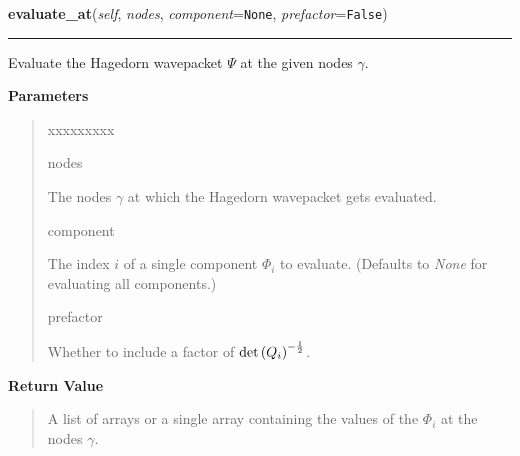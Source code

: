     \vspace{0.5ex}

\hspace{.8\funcindent}\begin{boxedminipage}{\funcwidth}

    \raggedright \textbf{evaluate\_at}(\textit{self}, \textit{nodes}, \textit{component}={\tt None}, \textit{prefactor}={\tt False})

    \vspace{-1.5ex}

    \rule{\textwidth}{0.5\fboxrule}
\setlength{\parskip}{2ex}
    Evaluate the Hagedorn wavepacket $\Psi$ at the given
    nodes $\gamma$.

\setlength{\parskip}{1ex}
      \textbf{Parameters}
      \vspace{-1ex}

      \begin{quote}
        \begin{Ventry}{xxxxxxxxx}

          \item[nodes]

          The nodes $\gamma$ at which the Hagedorn
          wavepacket gets evaluated.

          \item[component]

          The index $i$ of a single component $\Phi_i$
          to evaluate. (Defaults to \textit{None} for evaluating all components.)

          \item[prefactor]

          Whether to include a factor of
          $\det\left( Q_i \right)^{-\frac{1}{2}}$.

        \end{Ventry}

      \end{quote}

      \textbf{Return Value}
    \vspace{-1ex}

      \begin{quote}
      A list of arrays or a single array containing the values of the
      $\Phi_i$ at the nodes $\gamma$.

      \end{quote}

    \end{boxedminipage}

    \label{HagedornMultiWavepacket:HagedornMultiWavepacket:quadrate}

